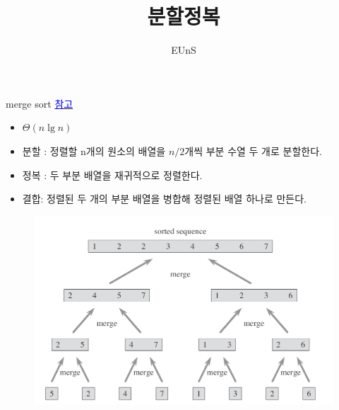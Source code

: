 \documentclass[10pt]{beamer}
\title{분할정복}
\author{EUnS}
\begin{document}
\begin{frame}{}
    \maketitle
\end{frame}    





\begin{frame}{merge sort}
    \href{https://www.youtube.com/watch?v=2YvFRAC8UTM&list=PL52K_8WQO5oUuH06MLOrah4h05TZ4n38l&index=11&t=0s}{\textcolor{blue}{참고}}
    \begin{itemize}
        \item $\Theta(n\lg n)$ \pause
        \item 분할 : 정렬할 n개의 원소의 배열을 $n/2$개씩 부분 수열 두 개로 분할한다. \pause
        \item 정복 : 두 부분 배열을 재귀적으로 정렬한다. \pause
        \item 결합: 정렬된 두 개의 부분 배열을 병합해 정렬된 배열 하나로 만든다.
    \end{itemize}
\end{frame}



\begin{frame}{}
    \begin{figure}[h!]
        \includegraphics[scale=0.4]{merge.png}
    \end{figure}
\end{frame}    
\end{document}
